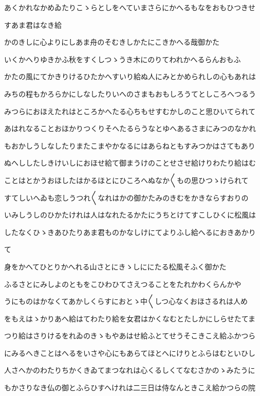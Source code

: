 \documentclass[a4paper,11pt,landscape]{ltjtarticle}
\begin{document}
あくかれなかめゐたりこゝらとしをへていまさらにかへるもなをおもひつきせ
\par\medskip
すあま君はなき給
\par\medskip
かのきしに心よりにしあま舟のそむきしかたにこきかへる哉御かた
\par\medskip
いくかへりゆきかふ秋をすくしつゝうき木にのりてわれかへるらんおもふ
\par\medskip
かたの風にてかきりけるひたかへすいり給ぬ人にみとかめられしの心もあれは
\par\medskip
みちの程もかろらかにしなしたりいへのさまもおもしろうてとしころへつるう
\par\medskip
みつらにおほえたれはところかへたる心ちもせすむかしのこと思ひいてられて
\par\medskip
あはれなることおほかりつくりそへたるらうなとゆへあるさまにみつのなかれ
\par\medskip
もおかしうしなしたりまたこまやかなるにはあらねともすみつかはさてもあり
\par\medskip
ぬへししたしきけいしにおほせ給て御まうけのことせさせ給けりわたり給はむ
\par\medskip
ことはとかうおほしたはかるほとにひころへぬなか〱もの思ひつゝけられて
\par\medskip
すてしいへゐも恋しうつれ〱なれはかの御かたみのきむをかきならすおりの
\par\medskip
いみしうしのひかたけれは人はなれたるかたにうちとけてすこしひくに松風は
\par\medskip
したなくひゝきあひたりあま君ものかなしけにてよりふし給へるにおきあかり
\par\medskip
て
\par\medskip
身をかへてひとりかへれる山さとにきゝしににたる松風そふく御かた
\par\medskip
ふるさとにみしよのともをこひわひてさえつることをたれかわくらんかや
\par\medskip
うにものはかなくてあかしくらすにおとゝ中〱しつ心なくおほさるれは人め
\par\medskip
をもえはゝかりあへ給はてわたり給を女君はかくなむとたしかにしらせたてま
\par\medskip
つり給はさりけるをれゐのきゝもやあはせ給ふとてせうそこきこえ給ふかつら
\par\medskip
にみるへきことはへるをいさや心にもあらてほとへにけりとふらはむといひし
\par\medskip
人さへかのわたりちかくきゐてまつなれは心くるしくてなむさかのゝみたうに
\par\medskip
もかさりなき仏の御とふらひすへけれは二三日は侍なんときこえ給かつらの院
\end{document}
